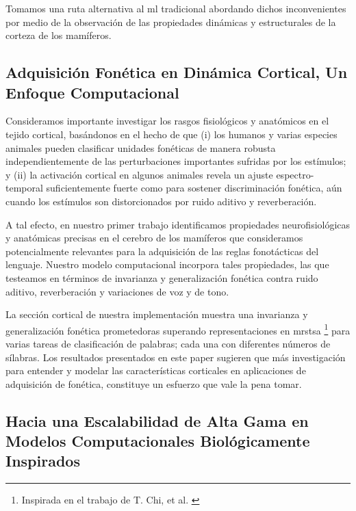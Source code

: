 Tomamos una ruta alternativa al \gls{ml} tradicional abordando dichos inconvenientes por medio de la observación de las propiedades dinámicas y estructurales de la corteza de los mamíferos.

\subsection{Adquisición Fonética en Dinámica Cortical, Un Enfoque Computacional}

Consideramos importante investigar los rasgos fisiológicos y anatómicos en el tejido cortical,
basándonos en el hecho de que (i) los humanos y varias especies animales pueden clasificar unidades fonéticas de manera robusta independientemente de las perturbaciones importantes sufridas por los estímulos; y (ii) la activación cortical en algunos animales revela un ajuste espectro-temporal suficientemente fuerte como para sostener discriminación fonética, aún cuando los estímulos son distorcionados por ruido aditivo y reverberación.

A tal efecto, en nuestro primer trabajo \cite{10.1371/journal.pone.0217966} identificamos propiedades neurofisiológicas y anatómicas precisas en el cerebro de los mamíferos que consideramos potencialmente relevantes para la adquisición de las reglas fonotácticas del lenguaje.
Nuestro modelo computacional incorpora tales propiedades, las que testeamos en términos de invarianza y generalización fonética contra ruido aditivo, reverberación y variaciones de voz y de tono.

La sección cortical de nuestra implementación muestra una invarianza y generalización fonética prometedoras superando representaciones en \gls{mrstsa} 
\footnote{Inspirada en el trabajo de T. Chi, et al. \cite{chi_2005}}
para varias tareas de clasificación de palabras; cada una con diferentes números de sílabras.
Los resultados presentados en este paper sugieren que más investigación para entender y modelar las características corticales en aplicaciones de adquisición de fonética, constituye un esfuerzo que vale la pena tomar.






\subsection{Hacia una Escalabilidad de Alta Gama en Modelos Computacionales Biológicamente Inspirados}

